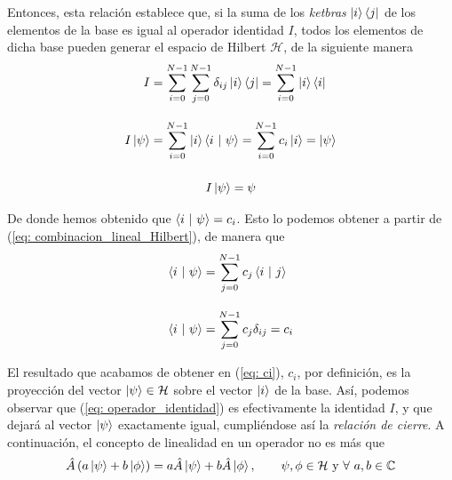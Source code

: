 \documentclass[12pt]{article}
\numberwithin{equation}{section} %
\begin{document}
    \vspace{1.5mm}

    Entonces, esta relación establece que, si la suma de los \textit{ketbras} \( \ket{i} \bra{j} \) de los elementos de la base es igual al operador identidad \( I \), todos los elementos de dicha base pueden generar el espacio de Hilbert \( \mathcal{H} \), de la siguiente manera
    \begin{align*}
        I &= \sum_{i = 0}^{N - 1} \sum_{j = 0}^{N -1} \delta_{ij} \ket{i} \bra{j} = \sum_{i = 0}^{N -1} \ket{i} \bra{i} \\[10pt]
        I \ket{\psi} &= \sum_{i = 0}^{N - 1} \ket{i} \braket{i \ | \ \psi} = \sum_{i = 0}^{N - 1} c_{i} \ket{i} = \ket{\psi} \\[10pt]
    \end{align*}
    \begin{equation}
        I \ket{\psi} = \psi
        \label{eq: operador_identidad}
    \end{equation}

    \vspace{1.5mm}

    De donde hemos obtenido que \( \braket{i \ | \ \psi} = c_{i} \). Esto lo podemos obtener a partir de (\ref{eq: combinacion_lineal_Hilbert}), de manera que
    \begin{align}
        \braket{i \ | \ \psi} &= \sum_{j = 0}^{N - 1} c_{j} \braket{i \ | \ j} \\[10pt]
        \braket{i \ | \ \psi} &= \sum_{j = 0}^{N - 1} c_{j} \delta_{ij} = c_{i}\label{eq: ci}
    \end{align}
    
    \vspace{1.5mm}

    El resultado que acabamos de obtener en (\ref{eq: ci}), \( c_{i} \), por definición, es la proyección del vector \( \ket{\psi} \in \mathcal{H} \) sobre el vector \( \ket{i} \) de la base. Así, podemos observar que (\ref{eq: operador_identidad}) es efectivamente la identidad \( I \), y que dejará al vector \( \ket{\psi}\) exactamente igual, cumpliéndose así la \textit{relación de cierre}. A continuación, el concepto de linealidad en un operador no es más que
    \begin{equation}
        \hat{A} \left( a \ket{\psi} + b \ket{\phi} \right) = a \hat{A} \ket{\psi} + b \hat{A} \ket{\phi}, \qquad \psi, \phi \in  \mathcal{H} \ \text{y} \ \forall \ a,b \in \mathbb{C} 
        \label{eq: linealidad_operador}
    \end{equation}
\end{document}
